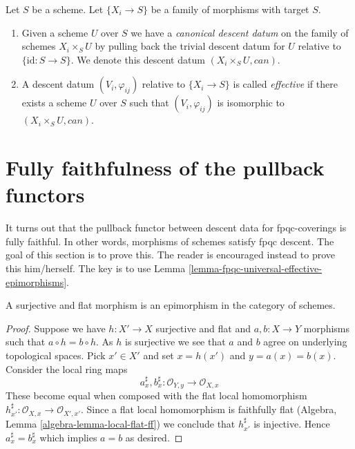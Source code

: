 \begin{definition}
\label{definition-effective-family}
Let $S$ be a scheme.
Let $\{X_i \to S\}$ be a family of morphisms
with target $S$.
\begin{enumerate}
\item  Given a scheme $U$ over $S$
we have a {\it canonical descent datum} on the family of
schemes $X_i \times_S U$ by pulling back the trivial
descent datum for $U$ relative to $\{\text{id} : S \to S\}$.
We denote this descent datum $(X_i \times_S U, can)$.
\item A descent datum $(V_i, \varphi_{ij})$
relative to $\{X_i \to S\}$ is called {\it effective}
if there exists a scheme $U$ over $S$ such that
$(V_i, \varphi_{ij})$ is isomorphic to $(X_i \times_S U, can)$.
\end{enumerate}
\end{definition}












\section{Fully faithfulness of the pullback functors}
\label{section-fully-faithful}

\noindent
It turns out that the pullback functor between descent data
for fpqc-coverings is fully faithful. In other words, morphisms of schemes
satisfy fpqc descent. The goal of this section
is to prove this. The reader is encouraged instead to prove this him/herself.
The key is to use Lemma \ref{lemma-fpqc-universal-effective-epimorphisms}.

\begin{lemma}
\label{lemma-surjective-flat-epi}
A surjective and flat morphism is an epimorphism in the
category of schemes.
\end{lemma}

\begin{proof}
Suppose we have $h : X' \to X$ surjective and flat and
$a, b : X \to Y$ morphisms such that $a \circ h = b \circ h$.
As $h$ is surjective we see that $a$ and $b$ agree on underlying
topological spaces. Pick $x' \in X'$ and set $x = h(x')$ and
$y = a(x) = b(x)$. Consider the local ring maps
$$
a^\sharp_x, b^\sharp_x : \mathcal{O}_{Y, y} \to \mathcal{O}_{X, x}
$$
These become equal when composed with
the flat local homomorphism
$h^\sharp_{x'} : \mathcal{O}_{X, x} \to \mathcal{O}_{X', x'}$.
Since a flat local homomorphism is faithfully flat
(Algebra, Lemma \ref{algebra-lemma-local-flat-ff})
we conclude that $h^\sharp_{x'}$ is injective.
Hence $a^\sharp_x = b^\sharp_x$ which implies $a = b$ as desired.
\end{proof}


